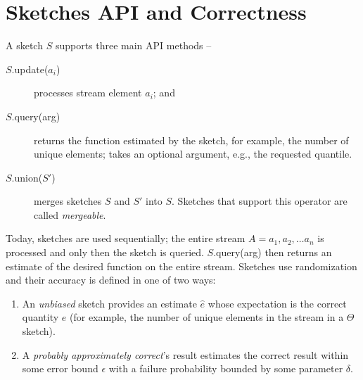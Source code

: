 \section{Sketches API and Correctness}
\label{sec:api}


A sketch $S$ supports three main API methods -- 
\begin{description}
\item[$S$.update($a_i$)] processes stream element $a_i$; and 
\item[$S$.query(arg)] returns the function estimated by the sketch, for example, the number of unique elements; 
 takes an optional argument, e.g., the requested quantile.
 \item[$S$.union($S'$)] merges sketches $S$ and $S'$ into $S$.
 Sketches that support this operator are called \emph{mergeable}.
\end{description}

Today, sketches are used sequentially; the entire stream $A = a_1, a_2, \dots a_n$ is processed 
and only then the sketch is queried. $S$.query(arg) then returns an estimate of the desired function 
on the entire stream. 
Sketches use randomization and their accuracy is defined in one of two ways:
\begin{enumerate}
\item An \emph{unbiased} sketch provides an estimate  $\hat{e}$ whose expectation is the correct quantity $e$ 
(for example, the number of unique elements in the stream in a $\Theta$ sketch).  
\item A \emph{probably approximately correct}'s  result  estimates the correct result
within some error bound $\epsilon$ with a failure probability bounded by some parameter $\delta$.  

\end{enumerate} 

